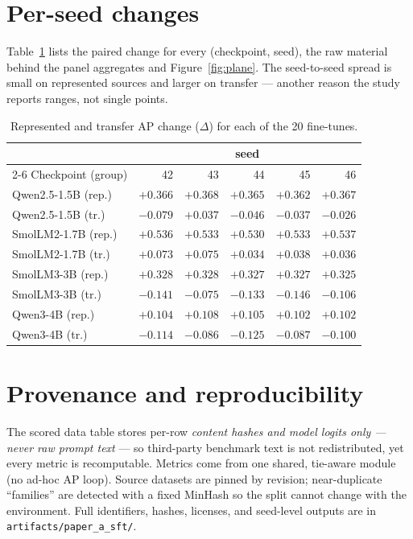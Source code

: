 \documentclass[11pt]{article}
\newcommand{\code}[1]{\texttt{\small #1}}
\begin{document}
\appendix
\section{Per-seed changes}
Table~\ref{tab:seeds} lists the paired change for every (checkpoint, seed), the raw material
behind the panel aggregates and Figure~\ref{fig:plane}. The seed-to-seed spread is small on
represented sources and larger on transfer --- another reason the study reports ranges, not
single points.

\begin{table}[h]
\centering\small
\caption{Represented and transfer AP change ($\Delta$) for each of the 20 fine-tunes.}
\label{tab:seeds}
\begin{tabular}{l rrrrr}
\toprule
& \multicolumn{5}{c}{seed} \\
\cmidrule(lr){2-6}
Checkpoint (group) & 42 & 43 & 44 & 45 & 46 \\
\midrule
Qwen2.5-1.5B (rep.)  & $+0.366$ & $+0.368$ & $+0.365$ & $+0.362$ & $+0.367$ \\
Qwen2.5-1.5B (tr.)   & $-0.079$ & $+0.037$ & $-0.046$ & $-0.037$ & $-0.026$ \\
SmolLM2-1.7B (rep.)  & $+0.536$ & $+0.533$ & $+0.530$ & $+0.533$ & $+0.537$ \\
SmolLM2-1.7B (tr.)   & $+0.073$ & $+0.075$ & $+0.034$ & $+0.038$ & $+0.036$ \\
SmolLM3-3B (rep.)   & $+0.328$ & $+0.328$ & $+0.327$ & $+0.327$ & $+0.325$ \\
SmolLM3-3B (tr.)    & $-0.141$ & $-0.075$ & $-0.133$ & $-0.146$ & $-0.106$ \\
Qwen3-4B (rep.)    & $+0.104$ & $+0.108$ & $+0.105$ & $+0.102$ & $+0.102$ \\
Qwen3-4B (tr.)     & $-0.114$ & $-0.086$ & $-0.125$ & $-0.087$ & $-0.100$ \\
\bottomrule
\end{tabular}
\end{table}

\section{Provenance and reproducibility}
The scored data table stores per-row \emph{content hashes and model logits only --- never raw
prompt text} --- so third-party benchmark text is not redistributed, yet every metric is
recomputable. Metrics come from one shared, tie-aware module (no ad-hoc AP loop). Source
datasets are pinned by revision; near-duplicate ``families'' are detected with a fixed MinHash
so the split cannot change with the environment. Full identifiers, hashes, licenses, and
seed-level outputs are in \code{artifacts/paper\_a\_sft/}.
\end{document}
